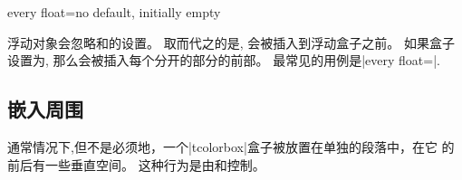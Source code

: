 \begin{docTcbKey}[][doc new=2014-09-19]{every float}{=}{no default, initially empty}

浮动对象会忽略和的设置。
取而代之的是, 会被插入到浮动盒子之前。
如果盒子设置为, 那么会被插入每个分开的部分的前部。
最常见的用例是|every float=\centering|.

\begin{dispListing}
\end{dispListing}
{\tcbusetemp}

\end{docTcbKey}

\subsection{嵌入周围}\label{subsec:surroundings}

通常情况下,但不是必须地，一个|tcolorbox|盒子被放置在单独的段落中，在它%
的前后有一些垂直空间。%
这种行为是由和控制。

